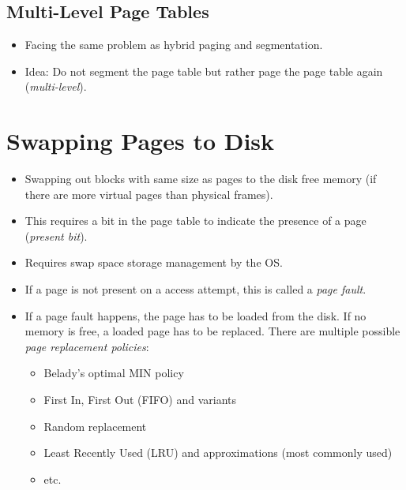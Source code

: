 \documentclass[a4paper, 11pt, accentcolor = tud3b]{tudreport}
\begin{document}
	        \subsection{Multi-Level Page Tables} %
		        \label{sec:multilevelpaging}
		        
	        
		        \begin{itemize}
		        	\item Facing the same problem as hybrid paging and segmentation.
		        	\item Idea: Do not segment the page table but rather page the page table again (\textit{multi-level}).
		        \end{itemize}

        \section{Swapping Pages to Disk} %
        
            \begin{itemize}
            	\item Swapping out blocks with same size as pages to the disk free memory (if there are more virtual pages than physical frames).
            	\item This requires a bit in the page table to indicate the presence of a page (\textit{present bit}).
            	\item Requires swap space storage management by the OS.
            	\item If a page is not present on a access attempt, this is called a \textit{page fault}.
            	\item If a page fault happens, the page has to be loaded from the disk. If no memory is free, a loaded page has to be replaced. There are multiple possible \textit{page replacement policies}:
	            	\begin{itemize}
	            		\item Belady's optimal MIN policy
	            		\item First In, First Out (FIFO) and variants
	            		\item Random replacement
	            		\item Least Recently Used (LRU) and approximations (most commonly used)
	            		\item etc.
	            	\end{itemize}
            \end{itemize}
\end{document}
